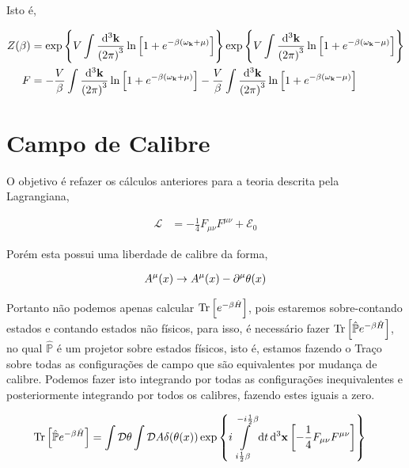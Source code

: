 \documentclass[twoside]{amsart}
\newcommand{\Dd}[1]{\mathcal D #1}
\numberwithin{equation}{section}
\begin{document}
Isto é,

\begin{align}
    Z\qty(\beta)&=\exp\qty{V\int\frac{\dd[3]{\vb k}}{\qty(2\pi)^3}\ln\qty[1+e^{-\beta\qty(\omega_{\vb k}+\mu)}]}\exp\qty{V\int\frac{\dd[3]{\vb k}}{\qty(2\pi)^3}\ln\qty[1+e^{-\beta\qty(\omega_{\vb k}-\mu)}]}\\
    F&=-\frac V\beta\int\frac{\dd[3]{\vb k}}{\qty(2\pi)^3}\ln\qty[1+e^{-\beta\qty(\omega_{\vb k}+\mu)}]-\frac V\beta\int\frac{\dd[3]{\vb k}}{\qty(2\pi)^3}\ln\qty[1+e^{-\beta\qty(\omega_{\vb k}-\mu)}]
\end{align}



\section{Campo de Calibre}

O objetivo é refazer os cálculos anteriores para a teoria descrita pela Lagrangiana, 

\begin{align}
    \mathcal L&=-\frac14F_{\mu\nu}F^{\mu\nu}+\mathcal E_0
\end{align}

Porém esta possui uma liberdade de calibre da forma,

\begin{align}
    A^\mu\qty(x)\rightarrow A^\mu\qty(x)-\partial^\mu\theta\qty(x)
\end{align}

Portanto não podemos apenas calcular $\Tr\qty[e^{-\beta\hat H}]$, pois estaremos sobre-contando estados e contando estados não físicos, para isso, é necessário fazer $\Tr\qty[\hat{\mathbb P}e^{-\beta\hat H}]$, no qual $\hat{\mathbb P}$ é um projetor sobre estados físicos, isto é, estamos fazendo o Traço sobre todas as configurações de campo que são equivalentes por mudança de calibre. Podemos fazer isto integrando por todas as configurações inequivalentes e posteriormente integrando por todos os calibres, fazendo estes iguais a zero.

\begin{align}
    \Tr\qty[\hat{\mathbb P}e^{-\beta\hat H}]&=\int\Dd{\theta}\int\Dd{A}\delta\qty(\theta\qty(x))\exp\qty{i\int\limits_{i\frac12\beta}^{-i\frac12\beta}\dd{t}\dd[3]{\vb x}\qty[-\frac14F_{\mu\nu}F^{\mu\nu}]}
\end{align}
\end{document}

